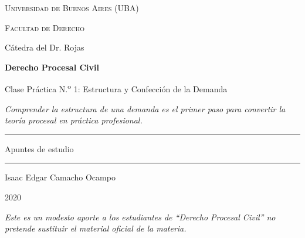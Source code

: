 \documentclass[12pt,oneside]{book}
\newcommand{\universidad}{Universidad de Buenos Aires (UBA)}
\newcommand{\facultad}{Facultad de Derecho}
\newcommand{\catedra}{Cátedra del Dr. Rojas}
\newcommand{\materia}{Derecho Procesal Civil}
\newcommand{\titulo}{Clase Práctica N.\textsuperscript{o} 1: Estructura y Confección de la Demanda}
\newcommand{\autor}{Isaac Edgar Camacho Ocampo}
\newcommand{\anio}{2020}
\begin{document}
\begin{titlepage}

\thispagestyle{empty}

\begin{center}

\vspace*{1cm}

{\large \textsc{\universidad}}

\vspace{0.2cm}

{\large \textsc{\facultad}}

\vspace{0.2cm}

{\large \catedra}

\vspace{3cm}

{\Huge \textbf{\materia}}

\vspace{1cm}

{\LARGE \titulo}

\vspace{0.8cm}

\textit{Comprender la estructura de una demanda es el primer paso para convertir la teoría procesal en práctica profesional.}

\vspace{1.2cm}

\rule{0.70\textwidth}{0.5pt}

\vspace{0.5cm}

{\large Apuntes de estudio}

\vspace{0.5cm}

\rule{0.70\textwidth}{0.5pt}

\vfill

{\large \autor}

\vspace{0.3cm}

{\large \anio}

\end{center}

\vfill

\begin{flushleft}
\textit{Este es un modesto aporte a los estudiantes de ``Derecho Procesal Civil'' no pretende sustituir el material oficial de la materia.}
\end{flushleft}

\end{titlepage}
\end{document}
